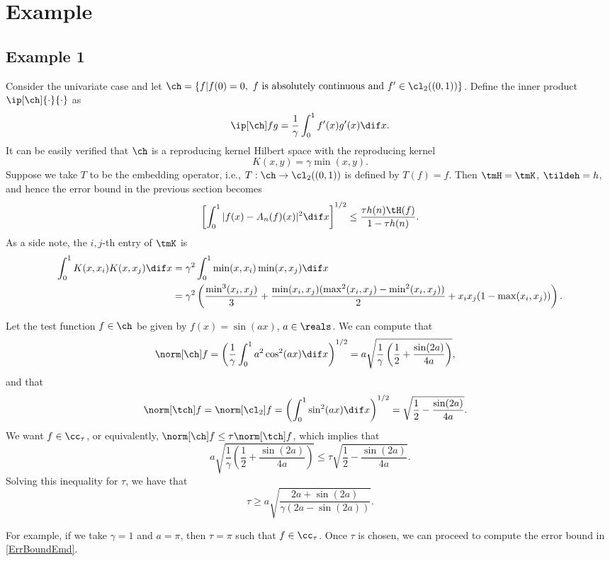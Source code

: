 \documentclass[11pt]{amsart}
\newcommand{\g}{\gamma}
\theoremstyle{definition}
\begin{document}
\section{Example}
\subsection{Example 1}
Consider the univariate case and let $\ch=\left\{f|f(0)=0,\ f\mbox{ is absolutely continuous and }f'\in\cl_2((0,1))\right\}$. Define the inner product $\ip[\ch]{\cdot}{\cdot}$ as
$$\ip[\ch]fg=\frac1\g\int_0^1f'(x)g'(x)\dif x.$$
It can be easily verified that $\ch$ is a reproducing kernel Hilbert space with the reproducing kernel
$$K(x,y)=\g\min(x,y).$$
Suppose we take $T$ to be the embedding operator, i.e., $T:\ch\to\cl_2((0,1))$ is defined by $T(f)=f$. Then $\tmH=\tmK$, $\tildeh=h$, and hence the error bound in the previous section becomes
\begin{equation}\label{ErrBoundEmd}
\left[\int_0^1|f(x)-A_n(f)(x)|^2\dif x\right]^{1/2}\le\frac{\tau h(n)\tH(f)}{1-\tau h(n)}.
\end{equation}
As a side note, the $i,j$-th entry of $\tmK$ is
\begin{align*}
\int_0^1K(x,x_i)K(x,x_j)\dif x&=\g^2\int_0^1\min(x,x_i)\min(x,x_j)\dif x\\
&=\g^2\left(\frac{\min^3(x_i,x_j)}3+\frac{\min(x_i,x_j)(\max^2(x_i,x_j)-\min^2(x_i,x_j))}2+x_ix_j(1-\max(x_i,x_j))\right).
\end{align*}

Let the test function $f\in\ch$ be given by $f(x)=\sin(ax)$, $a\in\reals$. We can compute that
\begin{align*}
\norm[\ch]f&=\left(\frac1\g\int_0^1a^2\cos^2(ax)\dif x\right)^{1/2}=a\sqrt{\frac1\g\left(\frac12+\frac{\sin(2a)}{4a}\right)},
\end{align*}
and that
\begin{align*}
\norm[\tch]f&=\norm[\cl_2]f=\left(\int_0^1\sin^2(ax)\dif x\right)^{1/2}=\sqrt{\frac12-\frac{\sin(2a)}{4a}}.
\end{align*}
We want $f\in\cc_\tau$, or equivalently, $\norm[\ch]f\le\tau\norm[\tch]f$, which implies that
$$a\sqrt{\frac1\g\left(\frac12+\frac{\sin(2a)}{4a}\right)}\le\tau\sqrt{\frac12-\frac{\sin(2a)}{4a}}.$$
Solving this inequality for $\tau$, we have that
$$\tau\ge a\sqrt{\frac{2a+\sin(2a)}{\g(2a-\sin(2a))}}.$$

For example, if we take $\g=1$ and $a=\pi$, then $\tau=\pi$ such that $f\in\cc_\tau$. Once $\tau$ is chosen, we can proceed to compute the error bound in \eqref{ErrBoundEmd}.
\end{document}
